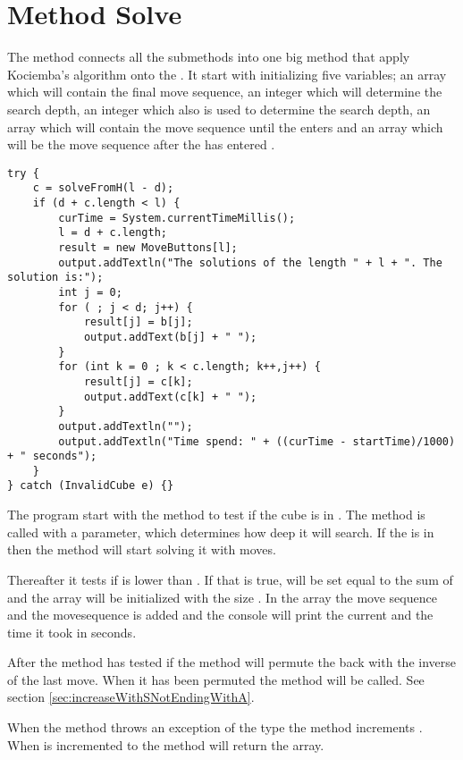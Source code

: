 \section{Method Solve}
\label{sec:kSolve}
The method  connects all the submethods into one big method that apply Kociemba's algorithm onto the \rubik{}. 
It start with initializing five variables; 
an array  which will contain the final move sequence, an integer  which will determine the search depth, 
an integer  which also is used to determine the search depth, 
an array  which will contain the move sequence until the \rubik{} enters  
and an array  which will be the move sequence after the \rubik{} has entered .

\begin{lstlisting}[style=sourceCode, caption=\myCaption{Key point in kociemba's optimal solver}, label=src:kociemba]
try {
	c = solveFromH(l - d);
	if (d + c.length < l) {
		curTime = System.currentTimeMillis();
		l = d + c.length;
		result = new MoveButtons[l];
		output.addTextln("The solutions of the length " + l + ". The solution is:");
		int j = 0;
		for ( ; j < d; j++) {
			result[j] = b[j];
			output.addText(b[j] + " ");
		}
		for (int k = 0 ; k < c.length; k++,j++) {
			result[j] = c[k];
			output.addText(c[k] + " ");
		}
		output.addTextln("");
		output.addTextln("Time spend: " + ((curTime - startTime)/1000) + " seconds");
	}
} catch (InvalidCube e) {}
\end{lstlisting}

The program start with the  method to test if the cube is in . The method  is called with a parameter, which determines how deep it will search. If the \rubik{} is in  then the method will start solving it with  moves.

Thereafter it tests if  is lower than . 
If that is true,  will be set equal to the sum of  and the  array will be initialized with the size . 
In the  array the move sequence  and the movesequence  is added and the console will print the current  and the time it took in seconds.

After the method has tested if  the method will permute the \rubik{} back with the inverse of the last move. When it has been permuted the method  will be called. See section \ref{sec:increaseWithSNotEndingWithA}.

When the method  throws an exception of the type  the method increments . 
When  is incremented to  the method will return the  array.